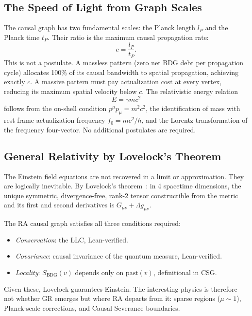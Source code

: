 \documentclass[11pt,a4paper]{article}
\newcommand{\SBDG}{S_{\mathrm{BDG}}}
\begin{document}
\subsection{The Speed of Light from Graph Scales}

The causal graph has two fundamental scales: the Planck length $l_P$ and
the Planck time $t_P$. Their ratio is the maximum causal propagation rate:
\begin{equation}
  c = \frac{l_P}{t_P}.
  \label{eq:c_derived}
\end{equation}
This is not a postulate. A massless pattern (zero net BDG debt per
propagation cycle) allocates 100\% of its causal bandwidth to spatial
propagation, achieving exactly $c$. A massive pattern must pay
actualization cost at every vertex, reducing its maximum spatial velocity
below $c$. The relativistic energy relation
\begin{equation}
  E = \gamma mc^2
  \label{eq:rel_energy}
\end{equation}
follows from the on-shell condition $p^\mu p_\mu = m^2c^2$, the
identification of mass with rest-frame actualization frequency
$f_0 = mc^2/h$, and the Lorentz transformation of the frequency
four-vector. No additional postulates are required.

\subsection{General Relativity by Lovelock's Theorem}

The Einstein field equations are not recovered in a limit or
approximation. They are logically inevitable. By Lovelock's
theorem~\citep{Lovelock1971}: in 4 spacetime dimensions, the unique
symmetric, divergence-free, rank-2 tensor constructible from the
metric and its first and second derivatives is
$G_{\mu\nu} + \Lambda g_{\mu\nu}$.

The RA causal graph satisfies all three conditions required:
\begin{itemize}[noitemsep]
  \item \emph{Conservation}: the LLC, Lean-verified.
  \item \emph{Covariance}: causal invariance of the quantum measure,
  Lean-verified.
  \item \emph{Locality}: $\SBDG(v)$ depends only on $\mathrm{past}(v)$,
  definitional in CSG.
\end{itemize}
Given these, Lovelock guarantees Einstein. The interesting physics is
therefore not whether GR emerges but where RA departs from it: sparse
regions ($\mu \sim 1$), Planck-scale corrections, and Causal Severance
boundaries.
\end{document}
